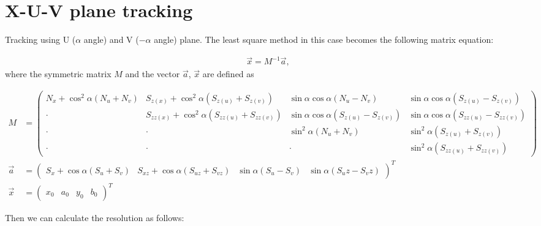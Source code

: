 \section{X-U-V plane tracking}
Tracking using U ($\alpha$ angle) and V ($-\alpha$ angle) plane. The least square method in this case becomes the following matrix equation:

\begin{align}
    \vec{x} = M^{-1} \vec{a},
\end{align}
where the symmetric matrix $M$ and the vector $\vec{a}$, $\vec{x}$ are defined as

\begin{adjustwidth}{-2.5cm}{-1.5cm}    
\begin{align}
    M &= \begin{pmatrix}
            N_x + \cos^2 \alpha (N_u + N_v) & S_{z(x)} + \cos^2 \alpha (S_{z(u)} + S_{z(v)}) & \sin \alpha \cos \alpha (N_u - N_v) & \sin \alpha \cos \alpha (S_{z(u)} - S_{z(v)}) \\
            \cdot & S_{zz(x)} + \cos^2 \alpha (S_{zz(u)} + S_{zz(v)}) & \sin \alpha \cos \alpha (S_{z(u)} - S_{z(v)}) & \sin \alpha \cos \alpha (S_{zz(u)} - S_{zz(v)}) \\
            \cdot & \cdot & \sin^2 \alpha (N_u + N_v) & \sin^2 \alpha (S_{z(u)} + S_{z(v)}) \\
            \cdot & \cdot & \cdot & \sin^2 \alpha (S_{zz(u)} + S_{zz(v)})
        \end{pmatrix} \\
    \vec{a} &= \begin{pmatrix}
            S_x + \cos \alpha (S_u + S_v) & S_{xz} + \cos \alpha (S_{uz} + S_{vz}) &
            \sin \alpha (S_u - S_v) & \sin \alpha (S_uz - S_vz)
        \end{pmatrix}^T \\
    \vec{x} &= \begin{pmatrix}
            x_0 & a_0 & y_0 & b_0
        \end{pmatrix}^T
\end{align}
\end{adjustwidth}

Then we can calculate the resolution as follows:

